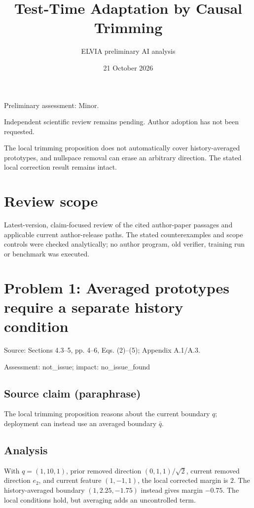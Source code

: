 \documentclass[11pt]{article}
\begin{document}
\title{Test-Time Adaptation by Causal Trimming}

\author{ELVIA preliminary AI analysis}\date{21 October 2026}\maketitle

Preliminary assessment: Minor.\par

Independent scientific review remains pending. Author adoption has not been requested.

The local trimming proposition does not automatically cover history-averaged prototypes, and nullspace removal can erase an arbitrary direction. The stated local correction result remains intact.

\section*{Review scope}

Latest-version, claim-focused review of the cited author-paper passages and applicable current author-release paths. The stated counterexamples and scope controls were checked analytically; no author program, old verifier, training run or benchmark was executed.

\section*{Problem 1: Averaged prototypes require a separate history condition}

Source: Sections 4.3–5, pp. 4–6, Eqs. (2)–(5); Appendix A.1/A.3.

Assessment: not\_issue; impact: no\_issue\_found

\subsection*{Source claim (paraphrase)}

The local trimming proposition reasons about the current boundary \(q\); deployment can instead use an averaged boundary \(\bar q\).

\subsection*{Analysis}

With \(q=(1,10,1)\), prior removed direction \((0,1,1)/\sqrt2\), current removed direction \(e_2\), and current feature \((1,-1,1)\), the local corrected margin is \(2\). The history-averaged boundary \((1,2.25,-1.75)\) instead gives margin \(-0.75\). The local conditions hold, but averaging adds an uncontrolled term.
\end{document}
